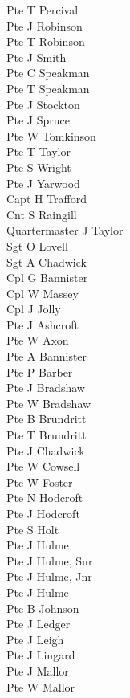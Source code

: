 \begin{multicols}{2}
  Pte T Percival \\
  Pte J Robinson \\
  Pte T Robinson \\
  Pte J Smith \\
  Pte C Speakman \\
  Pte T Speakman \\
  Pte J Stockton \\
  Pte J Spruce \\
  Pte W Tomkinson \\
  Pte T Taylor \\
  Pte S Wright \\
  Pte J Yarwood \\
  Capt H Trafford \\
  Cnt S Raingill \\
  Quartermaster J Taylor \\
  Sgt O Lovell \\
  Sgt A Chadwick \\
  Cpl G Bannister \\
  Cpl W Massey \\
  Cpl J Jolly \\
  Pte J Ashcroft \\
  Pte W Axon \\
  Pte A Bannister \\
  Pte P Barber \\
  Pte J Bradshaw \\
  Pte W Bradshaw \\
  Pte B Brundritt \\
  Pte T Brundritt \\
  Pte J Chadwick \\
  Pte W Cowsell \\
  Pte W Foster \\
  Pte N Hodcroft \\
  Pte J Hodcroft \\
  Pte S Holt \\
  Pte J Hulme \\
  Pte J Hulme, Snr \\
  Pte J Hulme, Jnr \\
  Pte J Hulme \\
  Pte B Johnson \\
  Pte J Ledger \\
  Pte J Leigh \\
  Pte J Lingard \\
  Pte J Mallor \\
  Pte W Mallor \\

\end{multicols}
